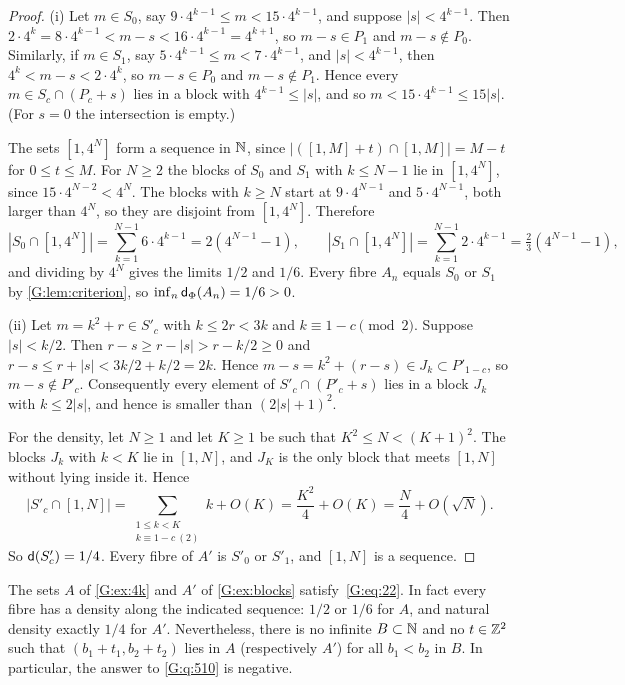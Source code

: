 \begin{proof}
(i) Let $m\in S_0$, say $9\cdot4^{k-1}\le m<15\cdot4^{k-1}$, and suppose $|s|<4^{k-1}$.
Then $2\cdot4^k=8\cdot4^{k-1}<m-s<16\cdot4^{k-1}=4^{k+1}$, so $m-s\in P_1$ and
$m-s\notin P_0$. Similarly, if $m\in S_1$, say $5\cdot4^{k-1}\le m<7\cdot4^{k-1}$, and
$|s|<4^{k-1}$, then $4^k<m-s<2\cdot4^k$, so $m-s\in P_0$ and $m-s\notin P_1$. Hence
every $m\in S_c\cap(P_c+s)$ lies in a block with $4^{k-1}\le|s|$, and so
$m<15\cdot4^{k-1}\le15|s|$. (For $s=0$ the intersection is empty.)

The sets $[1,4^N]$ form a \Fol{} sequence in $\mathbb{N}$, since $|([1,M]+t)\cap[1,M]|=M-t$ for
$0\le t\le M$. For $N\ge2$ the blocks of $S_0$ and $S_1$ with $k\le N-1$ lie in
$[1,4^N]$, since $15\cdot4^{N-2}<4^N$. The blocks with $k\ge N$ start at
$9\cdot4^{N-1}$ and $5\cdot4^{N-1}$, both larger than $4^N$, so they are disjoint from
$[1,4^N]$. Therefore
\[
|S_0\cap[1,4^N]|=\sum_{k=1}^{N-1}6\cdot4^{k-1}=2(4^{N-1}-1),\qquad
|S_1\cap[1,4^N]|=\sum_{k=1}^{N-1}2\cdot4^{k-1}=\tfrac23(4^{N-1}-1),
\]
and dividing by $4^N$ gives the limits $1/2$ and $1/6$. Every fibre $A_n$ equals $S_0$ or
$S_1$ by \cref{G:lem:criterion}, so $\inf_n\mathsf{d}_\Phi(A_n)=1/6>0$.

(ii) Let $m=k^2+r\in S'_c$ with $k\le2r<3k$ and $k\equiv1-c\pmod2$. Suppose $|s|<k/2$.
Then $r-s\ge r-|s|>r-k/2\ge0$ and $r-s\le r+|s|<3k/2+k/2=2k$. Hence
$m-s=k^2+(r-s)\in J_k\subset P'_{1-c}$, so $m-s\notin P'_c$. Consequently every element
of $S'_c\cap(P'_c+s)$ lies in a block $J_k$ with $k\le2|s|$, and hence is smaller than
$(2|s|+1)^2$.

For the density, let $N\ge1$ and let $K\ge1$ be such that $K^2\le N<(K+1)^2$. The blocks
$J_k$ with $k<K$ lie in $[1,N]$, and $J_K$ is the only block that meets $[1,N]$ without
lying inside it. Hence
\[
|S'_c\cap[1,N]|=\sum_{\substack{1\le k<K\\ k\equiv1-c\ (2)}}k+O(K)
=\frac{K^2}{4}+O(K)=\frac N4+O(\sqrt N).
\]
So $\mathsf{d}(S'_c)=1/4$. Every fibre of $A'$ is $S'_0$ or $S'_1$, and $[1,N]$ is a \Fol{}
sequence.
\end{proof}

\begin{theorem}\label{G:thm:q510}
The sets $A$ of \cref{G:ex:4k} and $A'$ of \cref{G:ex:blocks} satisfy~\eqref{G:eq:22}. In
fact every fibre has a density along the indicated \Fol{} sequence: $1/2$ or $1/6$
for $A$, and natural density exactly $1/4$ for $A'$. Nevertheless, there is no infinite
$B\subset\mathbb{N}$ and no $t\in\mathbb{Z}^2$ such that $(b_1+t_1,b_2+t_2)$ lies in $A$ (respectively
$A'$) for all $b_1<b_2$ in $B$. In particular, the answer to \cref{G:q:510} is negative.
\end{theorem}

